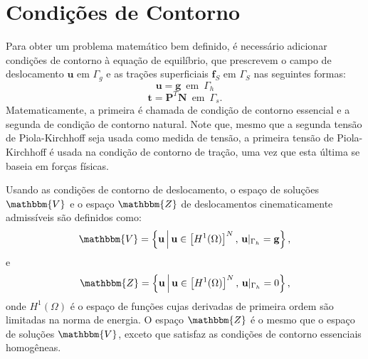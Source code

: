 \chapter{Condições de Contorno}\label{ch:CC}

Para obter um problema matemático bem definido, é necessário adicionar condições de contorno à equação de equilíbrio, que prescrevem o campo de deslocamento $ \mathbf{u} $ em $ \Gamma_g $ e as trações superficiais $ \mathbf{f}_S $ em $ \Gamma_S $ nas seguintes formas:
\begin{equation}
	\mathbf{u} = \mathbf{g} \, \text{ em } \, \Gamma_h
\end{equation}
\begin{equation}
	\mathbf{t} = \mathbf{P}^T \mathbf{N} \, \text{ em } \, \Gamma_s.
\end{equation}
Matematicamente, a primeira é chamada de condição de contorno essencial e a segunda de condição de contorno natural. Note que, mesmo que a segunda tensão de Piola-Kirchhoff seja usada como medida de tensão, a primeira tensão de Piola-Kirchhoff é usada na condição de contorno de tração, uma vez que esta última se baseia em forças físicas.

Usando as condições de contorno de deslocamento, o espaço de soluções $\mathbbm{V}$ e o espaço $\mathbbm{Z}$ de deslocamentos cinematicamente admissíveis são definidos como:
\begin{equation}
	\mathbbm{V} = \left\{ \mathbf{u} \, \Big| \, \mathbf{u} \in \left[H^1(\Omega)\right]^N, \, \mathbf{u}|_{\Gamma_h} = \mathbf{g} \right\}, 
\end{equation}
e
\begin{equation}
	\mathbbm{Z} = \left\{ \mathbf{u} \, \Big| \, \mathbf{u} \in \left[H^1(\Omega)\right]^N, \, \mathbf{u}|_{\Gamma_h} = 0 \right\},
\end{equation}
onde  $H^1(\Omega)$ é o espaço de funções cujas derivadas de primeira ordem são limitadas na norma de energia. O espaço $\mathbbm{Z}$ é o mesmo que o espaço de soluções $\mathbbm{V}$, exceto que satisfaz as condições de contorno essenciais homogêneas.